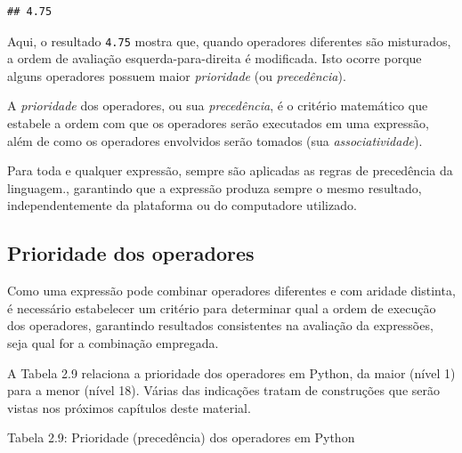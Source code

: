 \documentclass[
]{book}
\begin{document}
\begin{verbatim}
## 4.75
\end{verbatim}

Aqui, o resultado \texttt{4.75} mostra que, quando operadores diferentes são misturados, a ordem de avaliação esquerda-para-direita é modificada. Isto ocorre porque alguns operadores possuem maior \emph{prioridade} (ou \emph{precedência}).

A \emph{prioridade} dos operadores, ou sua \emph{precedência}, é o critério matemático que estabele a ordem com que os operadores serão executados em uma expressão, além de como os operadores envolvidos serão tomados (sua \emph{associatividade}).

Para toda e qualquer expressão, sempre são aplicadas as regras de precedência da linguagem., garantindo que a expressão produza sempre o mesmo resultado, independentemente da plataforma ou do computadore utilizado.

\hypertarget{comput-expre-prior}{%
\subsection{Prioridade dos operadores}\label{comput-expre-prior}}

Como uma expressão pode combinar operadores diferentes e com aridade distinta, é necessário estabelecer um critério para determinar qual a ordem de execução dos operadores, garantindo resultados consistentes na avaliação da expressões, seja qual for a combinação empregada.

A Tabela 2.9 relaciona a prioridade dos operadores em Python, da maior (nível 1) para a menor (nível 18). Várias das indicações tratam de construções que serão vistas nos próximos capítulos deste material.

Tabela 2.9: Prioridade (precedência) dos operadores em Python
\end{document}
